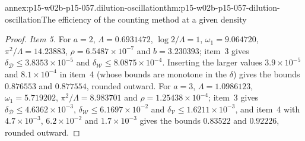 \begin{annexitem}{annex:p15-w02b-p15-057.dilution-oscillation}{thm:p15-w02b-p15-057-dilution-oscillation}{The efficiency of the counting method at a given density}
\begin{proof}
\emph{Item 5.} For \(a=2\), \(\Lambda=0.6931472\), \(\log2/\Lambda=1\),
\(\omega_1=9.064720\), \(\pi^2/\Lambda=14.23883\),
\(\rho=6.5487\times10^{-7}\) and \(b=3.230393\); item~3 gives
\(\delta_{\mathcal D}\leq3.8353\times10^{-5}\) and
\(\delta_{\mathcal W}\leq8.0875\times10^{-4}\). Inserting the larger values
\(3.9\times10^{-5}\) and \(8.1\times10^{-4}\) in item~4 (whose bounds are
monotone in the \(\delta\)) gives the bounds \(0.876553\) and \(0.877554\), rounded outward. For \(a=3\),
\(\Lambda=1.0986123\), \(\omega_1=5.719202\), \(\pi^2/\Lambda=8.983701\) and
\(\rho=1.25438\times10^{-4}\); item~3 gives
\(\delta_{\mathcal D}\leq4.6362\times10^{-3}\),
\(\delta_{\mathcal W}\leq6.1697\times10^{-2}\) and
\(\delta_{\mathcal V}\leq1.6211\times10^{-3}\), and item~4 with
\(4.7\times10^{-3}\), \(6.2\times10^{-2}\) and \(1.7\times10^{-3}\) gives
the bounds \(0.83522\) and \(0.92226\), rounded outward.
\end{proof}
\end{annexitem}


